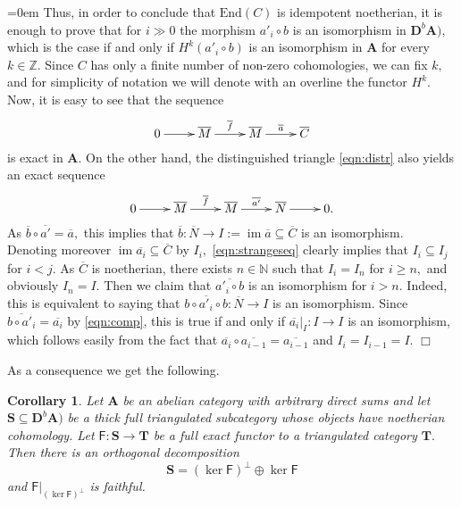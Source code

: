 \documentclass[a4paper,11pt,twoside]{amsart}
\newtheorem{cor}[thm]{Corollary}
\numberwithin{equation}{section}
\theoremstyle{definition}
\renewenvironment{proof}{\par\vspace{-5pt}\par\noindent\begingroup\leftskip=0em\hspace{0em}{\bf Proof.}}{\endgroup\hfill$\Box$}
\begin{document}
\begin{proof}
Thus, in order to conclude that ${\mathrm{End}}(C)$ is idempotent noetherian,
it is enough to prove that for $i\gg0$ the morphism $a'_i{\circ} b$ is an
isomorphism in ${\mathbf{D}^{b}}{{\mathbf{{A}}}}),$ which is the case if and only if
$H^k(a'_i{\circ} b)$ is an isomorphism in ${{\mathbf{{A}}}}$ for every $k\in{\mathbb{Z}}.$ Since
$C$ has only a finite number of non-zero cohomologies, we can fix $k,$
and for simplicity of notation we will denote with an overline the
functor $H^k.$ Now, it is easy to see that the sequence
\[
\xymatrix{
0\ar[r]&\overline{M}\ar[r]^-{\overline{f}}&\overline{M}\ar[r]^-{\overline{a}}&
\overline{C}
}
\]
is exact in ${{\mathbf{{A}}}}.$ On the other hand, the distinguished triangle
\eqref{eqn:distr} also yields an exact sequence
\[
\xymatrix{
0\ar[r]&\overline{M}\ar[r]^-{\overline{f}}&\overline{M}\ar[r]^-{\overline{a'}}&\overline{N}\ar[r]&0.
}
\]
As $\overline{b}{\circ} \overline{a'}=\overline{a},$ this
implies that $\overline{b}\colon\overline{N}\to
I:=\operatorname{im}\overline{a}\subseteq\overline{C}$ is an isomorphism. Denoting
moreover $\operatorname{im}\overline{a_i}\subseteq\overline{C}$ by $I_i,$
\eqref{eqn:strangeseq} clearly implies that $I_i\subseteq I_j$ for
$i<j.$ As $\overline{C}$ is noetherian, there exists $n\in{\mathbb{N}}$ such
that $I_i=I_n$ for $i\ge n,$ and obviously $I_n=I.$ Then we claim that
$\overline{a'_i{\circ} b}$ is an isomorphism for $i>n.$ Indeed, this is
equivalent to saying that $\overline{b{\circ} a'_i{\circ} b}\colon\overline{N}\to I$ is
an isomorphism. Since $\overline{b{\circ} a'_i}=\overline{a_i}$ by
\eqref{eqn:comp}, this is true if and only if
$\overline{a_i}{|_{{I}}}\colon I\to I$ is an isomorphism, which follows
easily from the fact that
$\overline{a_i}{\circ} \overline{a_{i-1}}=\overline{a_{i-1}}$ and $I_i=I_{i-1}=I.$
\end{proof}

As a consequence we get the following.

\begin{cor}\label{cor:semigen}
Let ${{\mathbf{{A}}}}$ be an abelian category with arbitrary direct sums and let ${{\mathbf{{S}}}}\subseteq{\mathbf{D}^{b}}{{\mathbf{{A}}}})$ be a thick full triangulated subcategory whose objects have noetherian cohomology. Let ${\mathsf{{F}}}\colon{{\mathbf{{S}}}}\longrightarrow{{\mathbf{{T}}}}$ be a full exact functor to a triangulated category ${{\mathbf{{T}}}}.$ Then there is an orthogonal decomposition
\[
{{\mathbf{{S}}}}={{(\ker{\mathsf{{F}}})}^{\perp}}{\oplus}\ker{\mathsf{{F}}}
\]
and ${\mathsf{{F}}}{|_{{{{(\ker{\mathsf{{F}}})}^{\perp}}}}}$ is faithful.
\end{cor}
\end{document}
